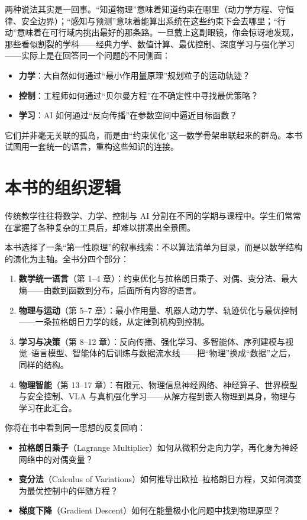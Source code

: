 两种说法其实是一回事。“知道物理”意味着知道约束在哪里（动力学方程、守恒律、安全边界）；“感知与预测”意味着能算出系统在这些约束下会去哪里；“行动”意味着在可行域内挑出最好的那条路。一旦戴上这副眼镜，你会惊讶地发现，那些看似割裂的学科——经典力学、数值计算、最优控制、深度学习与强化学习——实际上是在回答同一个问题的不同侧面：
\begin{itemize}
    \item \textbf{力学}：大自然如何通过“最小作用量原理”规划粒子的运动轨迹？
    \item \textbf{控制}：工程师如何通过“贝尔曼方程”在不确定性中寻找最优策略？
    \item \textbf{学习}：AI 如何通过“反向传播”在参数空间中逼近目标函数？
\end{itemize}

它们并非毫无关联的孤岛，而是由“约束优化”这一数学骨架串联起来的群岛。本书试图用一套统一的语言，重构这些知识的连接。

\section*{本书的组织逻辑}

传统教学往往将数学、力学、控制与 AI 分割在不同的学期与课程中。学生们常常在掌握了各种复杂的工具后，却难以拼凑出全景图。

本书选择了一条“第一性原理”的叙事线索：不以算法清单为目录，而是以数学结构的演化为主轴。全书分四个部分：
\begin{enumerate}
    \item \textbf{数学统一语言}（第 1--4 章）：约束优化与拉格朗日乘子、对偶、变分法、最大熵——由数到函数到分布，后面所有内容的语言。
    \item \textbf{物理与运动}（第 5--7 章）：最小作用量、机器人动力学、轨迹优化与最优控制——一条拉格朗日力学的线，从定律到机构到控制。
    \item \textbf{学习与决策}（第 8--12 章）：反向传播、强化学习、多智能体、序列建模与视觉--语言模型、智能体的后训练与数据流水线——把“物理”换成“数据”之后，同样的结构。
    \item \textbf{物理智能}（第 13--17 章）：有限元、物理信息神经网络、神经算子、世界模型与安全控制、VLA 与真机强化学习——从解方程到嵌入物理到具身，物理与学习在此汇合。
\end{enumerate}

你将在书中看到同一思想的反复回响：
\begin{itemize}
    \item \textbf{拉格朗日乘子}（Lagrange Multiplier）如何从微积分走向力学，再化身为神经网络中的对偶变量？
    \item \textbf{变分法}（Calculus of Variations）如何推导出欧拉--拉格朗日方程，又如何演变为最优控制中的伴随方程？
    \item \textbf{梯度下降}（Gradient Descent）如何在能量极小化问题中找到物理原型？
\end{itemize}

